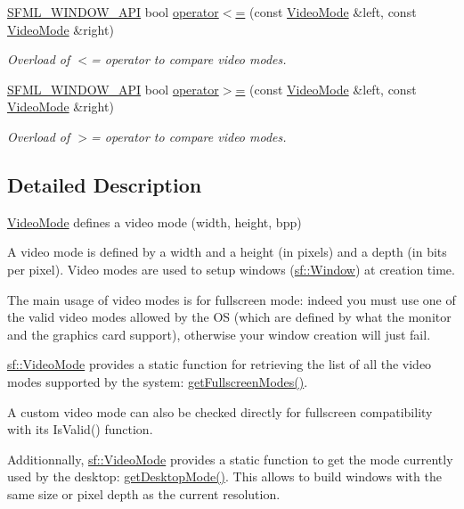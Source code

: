 \begin{DoxyCompactItemize}
\hyperlink{_window_2_export_8hpp_a1ab885b7907ee088350359516d68be64}{S\-F\-M\-L\-\_\-\-W\-I\-N\-D\-O\-W\-\_\-\-A\-P\-I} bool \hyperlink{classsf_1_1_video_mode_a09b0a83f9135d934e540800bad12f0ca}{operator$<$=} (const \hyperlink{classsf_1_1_video_mode}{Video\-Mode} \&left, const \hyperlink{classsf_1_1_video_mode}{Video\-Mode} \&right)
\begin{DoxyCompactList}\small\item\em Overload of $<$= operator to compare video modes. \end{DoxyCompactList}\item 
\hyperlink{_window_2_export_8hpp_a1ab885b7907ee088350359516d68be64}{S\-F\-M\-L\-\_\-\-W\-I\-N\-D\-O\-W\-\_\-\-A\-P\-I} bool \hyperlink{classsf_1_1_video_mode_a7f7983e336203d34c9878c77fff60f1f}{operator$>$=} (const \hyperlink{classsf_1_1_video_mode}{Video\-Mode} \&left, const \hyperlink{classsf_1_1_video_mode}{Video\-Mode} \&right)
\begin{DoxyCompactList}\small\item\em Overload of $>$= operator to compare video modes. \end{DoxyCompactList}\end{DoxyCompactItemize}


\subsection{Detailed Description}
\hyperlink{classsf_1_1_video_mode}{Video\-Mode} defines a video mode (width, height, bpp) 

A video mode is defined by a width and a height (in pixels) and a depth (in bits per pixel). Video modes are used to setup windows (\hyperlink{classsf_1_1_window}{sf\-::\-Window}) at creation time.

The main usage of video modes is for fullscreen mode\-: indeed you must use one of the valid video modes allowed by the O\-S (which are defined by what the monitor and the graphics card support), otherwise your window creation will just fail.

\hyperlink{classsf_1_1_video_mode}{sf\-::\-Video\-Mode} provides a static function for retrieving the list of all the video modes supported by the system\-: \hyperlink{classsf_1_1_video_mode_a6815b9b3b35767d5b4563fbed4bfc67b}{get\-Fullscreen\-Modes()}.

A custom video mode can also be checked directly for fullscreen compatibility with its Is\-Valid() function.

Additionnally, \hyperlink{classsf_1_1_video_mode}{sf\-::\-Video\-Mode} provides a static function to get the mode currently used by the desktop\-: \hyperlink{classsf_1_1_video_mode_ac1be160a4342e6eafb2cb0e8c9b18d44}{get\-Desktop\-Mode()}. This allows to build windows with the same size or pixel depth as the current resolution.


